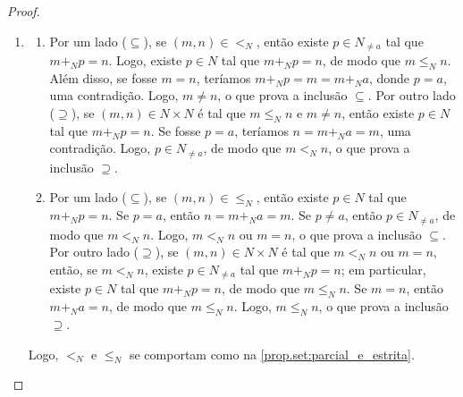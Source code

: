 \begin{proof}
\begin{enumerate}[leftmargin=*, align=left, label=\textbf{(\alph*)}]
\begin{midproof}
                \end{midproof}
                \begin{claim}
                    ${<_N}$ é transitiva.
                \end{claim}
                \begin{midproof}
                    Sejam $m,n,r \in N$ tais que $m <_N n$ e $n <_N r$. Então, existem $p,q \in N_{\neq a}$ tais que $m +_N p = n$ e $n +_N q = r$. Com isso,
                        \[
                            m +_N (p +_N q) = (m +_N p) +_N q = n +_N q = r,
                        \]
                    e como $p +_N q \neq a$ (pois, se fosse $p +_N q = a$, teríamos, $p=q=a$, uma contradição), existe $p +_N q \in N_{\neq a}$ tal que $m +_N (p +_N q) = r$, de modo que $m <_N r$. Logo, ${<_N}$ é transitiva. \whiteproof
                \end{midproof}
            Logo, ${<_N}$ é uma relação de ordem estrita em $N$. \blackproof
            \item 
                \begin{enumerate}[label=\roman*.]
                    \item Por um lado ($\subseteq$), se $(m,n) \in {<_N}$, então existe $p \in N_{\neq a}$ tal que $m +_N p = n$. Logo, existe $p \in N$ tal que $m +_N p=n$, de modo que $m \leq_N n$. Além disso, se fosse $m=n$, teríamos $m +_N p = m = m +_N a$, donde $p=a$, uma contradição. Logo, $m \neq n$, o que prova a inclusão $\subseteq$. Por outro lado ($\supseteq$), se $(m,n) \in N \times N$ é tal que $m \leq_N n$ e $m \neq n$, então existe $p \in N$ tal que $m +_N p=n$. Se fosse $p=a$, teríamos $n=m+_N a=m$, uma contradição. Logo, $p \in N_{\neq a}$, de modo que $m <_N n$, o que prova a inclusão $\supseteq$.
                    \item Por um lado ($\subseteq$), se $(m,n) \in {\leq_N}$, então existe $p \in N$ tal que $m +_N p=n$. Se $p=a$, então $n=m+_N a=m$. Se $p \neq a$, então $p \in N_{\neq a}$, de modo que $m <_N n$. Logo, $m <_N n$ ou $m=n$, o que prova a inclusão $\subseteq$. Por outro lado ($\supseteq$), se $(m,n) \in N \times N$ é tal que $m <_N n$ ou $m=n$, então, se $m <_N n$, existe $p \in N_{\neq a}$ tal que $m +_N p=n$; em particular, existe $p \in N$ tal que $m +_N p=n$, de modo que $m \leq_N n$. Se $m=n$, então $m+_N a=n$, de modo que $m \leq_N n$. Logo, $m \leq_N n$, o que prova a inclusão $\supseteq$.
                \end{enumerate}
            Logo, ${<_N}$ e ${\leq_N}$ se comportam como na \cref{prop.set:parcial_e_estrita}. \blackproof
        \end{enumerate}
\end{proof}

